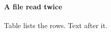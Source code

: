 \roomfor{\reproom}\label{\rep-r}
\paragraph*{A file read twice}\label{\rep-a}
Table lists the rows.
\ifdim\reproom pt>4.7pt \testtable{\rep-t}\fi
Text after it.
